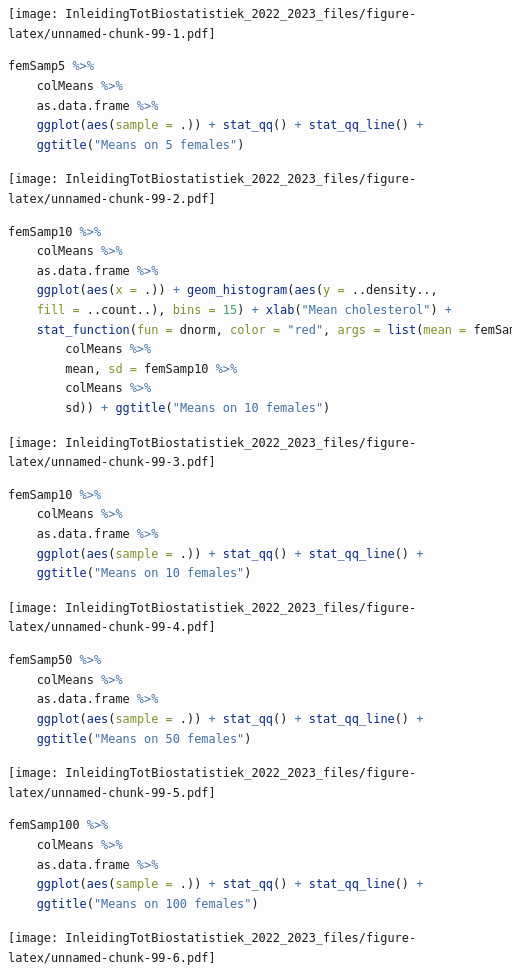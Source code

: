 \documentclass[
  12pt,dutch,coursenotes]{book}
\begin{document}
\texttt{[image: InleidingTotBiostatistiek\_2022\_2023\_files/figure-latex/unnamed-chunk-99-1.pdf]}

\begin{lstlisting}[language=R]
femSamp5 %>%
    colMeans %>%
    as.data.frame %>%
    ggplot(aes(sample = .)) + stat_qq() + stat_qq_line() +
    ggtitle("Means on 5 females")
\end{lstlisting}

\texttt{[image: InleidingTotBiostatistiek\_2022\_2023\_files/figure-latex/unnamed-chunk-99-2.pdf]}

\begin{lstlisting}[language=R]
femSamp10 %>%
    colMeans %>%
    as.data.frame %>%
    ggplot(aes(x = .)) + geom_histogram(aes(y = ..density..,
    fill = ..count..), bins = 15) + xlab("Mean cholesterol") +
    stat_function(fun = dnorm, color = "red", args = list(mean = femSamp10 %>%
        colMeans %>%
        mean, sd = femSamp10 %>%
        colMeans %>%
        sd)) + ggtitle("Means on 10 females")
\end{lstlisting}

\texttt{[image: InleidingTotBiostatistiek\_2022\_2023\_files/figure-latex/unnamed-chunk-99-3.pdf]}

\begin{lstlisting}[language=R]
femSamp10 %>%
    colMeans %>%
    as.data.frame %>%
    ggplot(aes(sample = .)) + stat_qq() + stat_qq_line() +
    ggtitle("Means on 10 females")
\end{lstlisting}

\texttt{[image: InleidingTotBiostatistiek\_2022\_2023\_files/figure-latex/unnamed-chunk-99-4.pdf]}

\begin{lstlisting}[language=R]
femSamp50 %>%
    colMeans %>%
    as.data.frame %>%
    ggplot(aes(sample = .)) + stat_qq() + stat_qq_line() +
    ggtitle("Means on 50 females")
\end{lstlisting}

\texttt{[image: InleidingTotBiostatistiek\_2022\_2023\_files/figure-latex/unnamed-chunk-99-5.pdf]}

\begin{lstlisting}[language=R]
femSamp100 %>%
    colMeans %>%
    as.data.frame %>%
    ggplot(aes(sample = .)) + stat_qq() + stat_qq_line() +
    ggtitle("Means on 100 females")
\end{lstlisting}

\texttt{[image: InleidingTotBiostatistiek\_2022\_2023\_files/figure-latex/unnamed-chunk-99-6.pdf]}
\end{document}
